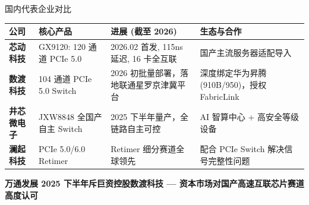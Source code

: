 \documentclass[aspectratio=169, 10pt, UTF8]{ctexbeamer}
\begin{document}
\begin{frame}{国内代表企业对比}
  \centering
  \footnotesize
  \begin{tabularx}{\textwidth}{p{2.0cm} p{3.0cm} p{4.0cm} p{3.5cm}}
    \toprule
    \textbf{公司} & \textbf{核心产品} & \textbf{进展 (截至 2026)} & \textbf{生态与合作} \\
    \midrule
    \textbf{芯动科技} & GX9120: 120 通道 PCIe 5.0 & 2026.02 首发, 115ns 延迟, 16 卡全互联 & 国产主流服务器适配导入 \\
    \addlinespace
    \textbf{数渡科技} & 104 通道 PCIe 5.0 Switch & 2026 初批量部署，落地联通星罗京津冀平台 & 深度绑定华为昇腾 (910B/950)，授权 FabricLink \\
    \addlinespace
    \textbf{井芯微电子} & JXW8848 全国产自主 Switch & 2025 下半年量产，全链路自主可控 & AI 智算中心 + 高安全等级设备 \\
    \addlinespace
    \textbf{澜起科技} & PCIe 5.0/6.0 Retimer & Retimer 细分赛道全球领先 & 配合 PCIe Switch 解决信号完整性问题 \\
    \bottomrule
  \end{tabularx}

  \vspace{6pt}
  \begin{center}
    \textbf{万通发展 2025 下半年斥巨资控股数渡科技 — 资本市场对国产高速互联芯片赛道高度认可}
  \end{center}
\end{frame}
\end{document}

